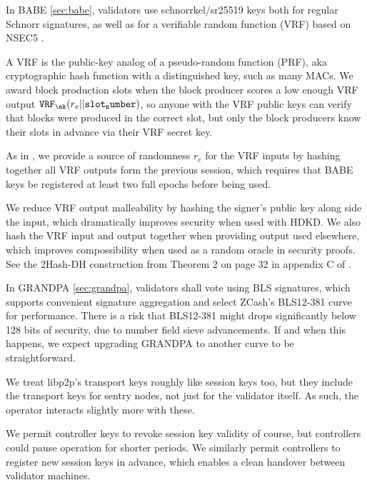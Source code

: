 In BABE \ref{sec:babe}, validators use schnorrkel/sr25519 keys both for regular Schnorr signatures, as well as for a verifiable random function (VRF) based on NSEC5 \cite{NSEC5}.  

A VRF is the public-key analog of a pseudo-random function (PRF), aka cryptographic hash function with a distinguished key, such as many MACs.  We award block production slots when the block producer scores a low enough VRF output $\mathtt{VRF}_{\sk}(r_e || \mathtt{slot_number} )$, so anyone with the VRF public keys can verify that blocks were produced in the correct slot, but only the block producers know their slots in advance via their VRF secret key.

As in \cite{Praos}, we provide a source of randomness $r_e$ for the VRF inputs by hashing together all VRF outputs form the previous session, which requires that BABE keys be registered at least two full epochs before being used.

We reduce VRF output malleability by hashing the signer's public key along side the input, which dramatically improves security when used with HDKD.  We also hash the VRF input and output together when providing output used elsewhere, which improves compossibility when used as a random oracle in security proofs.  See the 2Hash-DH construction from Theorem 2 on page 32 in appendix C of \cite{Praos}.  

In GRANDPA \ref{sec:grandpa}, validators shall vote using BLS signatures, which supports convenient signature aggregation and select ZCash's BLS12-381 curve for performance.  There is a risk that BLS12-381 might drops significantly below 128 bits of security, due to number field sieve advancements.  If and when this happens, we expect upgrading GRANDPA to another curve to be straightforward. 


We treat libp2p's transport keys roughly like session keys too, but they include the transport keys for sentry nodes, not just for the validator itself.  As such, the operator interacts slightly more with these.

We permit controller keys to revoke session key validity of course, but controllers could pause operation for shorter periods.  We similarly permit controllers to register new session keys in advance, which enables a clean handover between validator machines.

